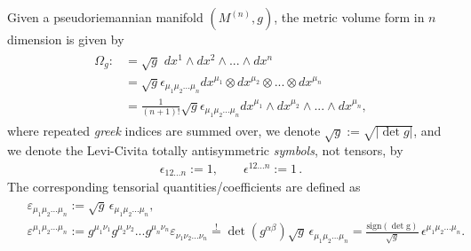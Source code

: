 \documentclass[../geometry_main.tex]{subfiles}
\begin{document}
\begin{mytheorem}
Given a pseudoriemannian manifold \((M^{(n)}, g)\), the metric volume form in $n$ dimension is given by 
\begin{align}\begin{aligned}
    \Omega_g:&=\sqrt{g}\,\,dx^1\wedge dx^2\wedge...\wedge dx^n \\
    &= \sqrt{g} \epsilon_{\mu_1\mu_2...\mu_n}dx^{\mu_1}\otimes dx^{\mu_2}\otimes...\otimes dx^{\mu_n}
    \\
    &= \tfrac{1}{(n+1)!}\sqrt{g} \epsilon_{\mu_1\mu_2...\mu_n}dx^{\mu_1}\wedge dx^{\mu_2}\wedge...\wedge dx^{\mu_n},
\end{aligned}
\end{align}
where repeated \emph{greek} indices are summed over, we denote {\small$\sqrt{g}:=\sqrt{|\det g|}$}, and we denote the Levi-Civita totally antisymmetric \emph{symbols}, not tensors, by
\begin{align}
    \epsilon_{12...n}:=1, \qquad \epsilon^{12...n}:=1\,.
\end{align}
The corresponding tensorial quantities/coefficients are defined as
\begin{align}\begin{aligned}
    &\varepsilon_{\mu_1\mu_2...\mu_n}:=\sqrt{g}\,\epsilon_{\mu_1\mu_2...\mu_n},
        \\
    &\varepsilon^{\mu_1\mu_2...\mu_n}:= g^{\mu_1\nu_1}g^{\mu_2\nu_2}...g^{\mu_n\nu_n}\varepsilon_{\nu_1\nu_2...\nu_n}
    {\overset{!}{=}} \det(g^{\alpha\beta}) \sqrt{g}\,\epsilon_{\mu_1\mu_2...\mu_n}
    =\tfrac{\operatorname{sign(\det g)}}{\sqrt{g}}\,\epsilon^{\mu_1\mu_2...\mu_n}.
\end{aligned}
\end{align}
\end{mytheorem}
\end{document}

